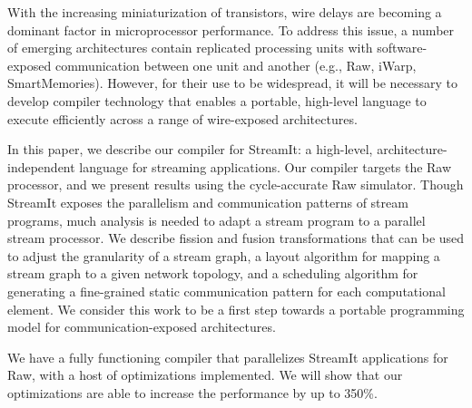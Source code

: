 With the increasing miniaturization of transistors, wire delays are
becoming a dominant factor in microprocessor performance.  To address
this issue, a number of emerging architectures contain replicated
processing units with software-exposed communication between one unit
and another (e.g., Raw, iWarp, SmartMemories).  However, for
their use to be widespread, it will be necessary to develop compiler
technology that enables a portable, high-level language to execute
efficiently across a range of wire-exposed architectures.

In this paper, we describe our compiler for StreamIt: a high-level,
architecture-independent language for streaming applications.  Our
compiler targets the Raw processor, and we present results using the
cycle-accurate Raw simulator.  Though StreamIt exposes the parallelism
and communication patterns of stream programs, much analysis is needed
to adapt a stream program to a parallel stream processor.  We describe
fission and fusion transformations that can be used to adjust the
granularity of a stream graph, a layout algorithm for mapping a stream
graph to a given network topology, and a scheduling algorithm for
generating a fine-grained static communication pattern for each
computational element.  We consider this work to be a first step
towards a portable programming model for communication-exposed
architectures.

We have a fully functioning compiler that parallelizes StreamIt
applications for Raw, with a host of optimizations implemented. We
will show that our optimizations are able to increase the performance
by up to 350\%.
